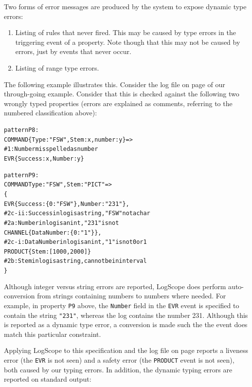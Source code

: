 \documentclass{report}
\newcommand{\logscope}{{\sc LogScope}}
\newenvironment{code}[1] %
{
\vspace{0.5cm}
\begin{center}
\begin{Sbox}
\begin{minipage}{11cm}
\begin{alltt}
{\bf\em #1}
}
{
\end{alltt}
\end{minipage}
\end{Sbox}
\setlength{\fboxsep}{8pt}
\fbox{\TheSbox}
\end{center}
\vspace{0.5cm}
}
\begin{document}
\noindent
Two forms of error messages are produced by the system to expose dynamic type errors:

\begin{enumerate}
  \item Listing of rules that never fired. This may be caused by type errors in the triggering event of a 
           property. Note though that this may not be caused by errors, just by events that never occur.
  \item Listing of range type errors.
\end{enumerate}

\noindent
The following example illustrates this. Consider the log file on page \pageref{script} of our through-going example. Consider that this is checked against the following two wrongly typed properties 
(errors are explained as comments, referring to the numbered classification above):

\begin{code}{}
pattern P8:  
  COMMAND\{Type : "FSW", Stem: x, number: y\} => 
   # 1: Number misspelled as number
    EVR\{Success: x, Number: y\}  

pattern P9 :
  COMMAND{Type: "FSW", Stem: "PICT"} => 
    \{
      EVR\{Success : \{0 : "FSW"\}, Number : "231"\}, 
       # 2c-ii: Success in log is a string, "FSW" not a char
       # 2a: Number in log is an int, "231" is not
      CHANNEL\{DataNumber : \{0 : "1"\}\}, 
       # 2c-i: DataNumber in log is an int, "1" is not 0 or 1
      PRODUCT\{Stem : [1000,2000]\}  
       # 2b: Stem in log is a string, cannot be in interval  
    \}
\end{code}

\noindent
Although integer versus string errors are reported, \logscope{} does perform auto-conversion from
strings containing numbers to numbers where needed. For example, in property
{\tt P9} above, the {\tt Number} field in the {\tt EVR} event is specified to contain the string
{\tt "231"}, whereas the log contains the number 231. Although this is reported as a dynamic type error,
a conversion is made such the the event does match this particular constraint.

\vspace{0.3cm}

\noindent
Applying \logscope{} to this specification and the log file on page \pageref{script} reports a liveness error
(the {\tt EVR} is not seen) and a safety error (the {\tt PRODUCT} event is not seen), both
caused by our typing errors. In addition, the dynamic typing errors are reported on 
standard output:
\end{document}

